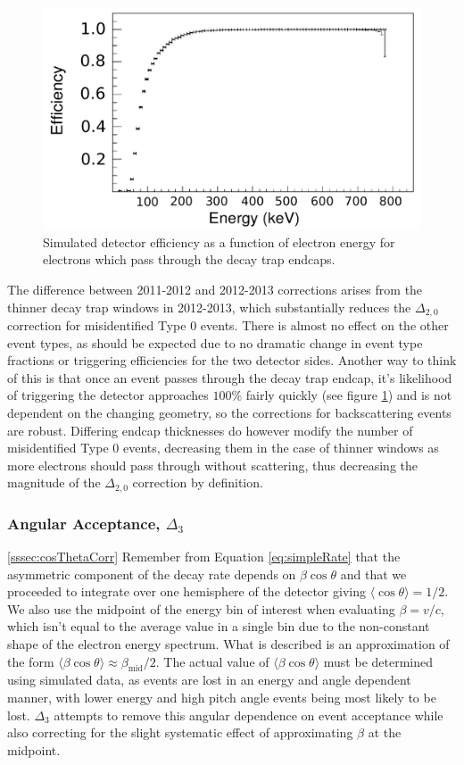 \begin{figure}[h]
  \centering
  \includegraphics[scale=0.40]{5-UCNAResults/efficiency.pdf}  
  \caption{Simulated detector efficiency as a function of electron energy for electrons which
  pass through the decay trap endcaps.}
  \label{fig:effic}
\end{figure}

The difference between 2011-2012 and 2012-2013 corrections arises from the thinner
decay trap windows in 2012-2013, which substantially reduces the $\Delta_{2,0}$
correction for
misidentified Type 0 events. There is almost no effect on the other event types, as should
be expected due to no dramatic change in event type fractions or triggering efficiencies
for the two detector sides. Another way to think of this is that once an event passes through the
decay trap endcap, it's likelihood of triggering the detector approaches $100\%$ fairly quickly
(see figure \ref{fig:effic}) and is not dependent on the changing geometry, so the corrections for
backscattering events are robust. Differing endcap thicknesses do however modify the number of misidentified
Type 0 events, decreasing them in the case of thinner windows as more electrons should pass through without
scattering, thus decreasing the magnitude of the
$\Delta_{2,0}$ correction by definition.


\subsubsection{Angular Acceptance, $\Delta_{3}$} \ref{sssec:cosThetaCorr}
Remember from Equation \ref{eq:simpleRate} that the asymmetric
component of the decay rate depends on
$\beta\cos\theta$ and that we proceeded to integrate over one hemisphere
of the detector giving $\langle\cos\theta\rangle=1/2$. We also use the midpoint
of the energy bin of interest when evaluating $\beta=v/c$, which isn't equal to the
average value in a single bin due to the non-constant shape of the electron energy
spectrum. What is described is
an approximation of the form $\langle\beta\cos\theta\rangle \approx \beta_{\mathrm{mid}}/2$. The actual
value of $\langle\beta\cos\theta\rangle$ must be determined using simulated
data, as events are lost in an energy and angle dependent manner, with lower energy and
high pitch angle events being most likely to be lost. $\Delta_{3}$ attempts to
remove this angular dependence on event acceptance while also correcting for the slight
systematic effect of approximating $\beta$ at the midpoint.

